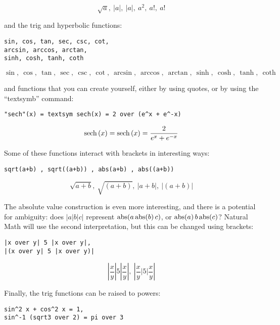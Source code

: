 \documentclass[12pt]{article}
\begin{document}
\[
\sqrt{a} , \ \left| a \right| , \ \left| a \right| , \ {a} ^ 2 , \ a ! , \ a !
\]

\noindent and the trig and hyperbolic functions:

\begin{verbatim}
sin, cos, tan, sec, csc, cot, 
arcsin, arccos, arctan, 
sinh, cosh, tanh, coth
\end{verbatim}

\[
\sin , \ \cos , \ \tan , \ \sec , \ \csc , \ \cot , \ \arcsin , \ \arccos , \ \arctan , \ \sinh , \ \cosh , \ \tanh , \ \coth
\]

\noindent and functions that you can create yourself, either by using quotes, or by
using the ``textsymb'' command:

\begin{verbatim}
"sech"(x) = textsym sech(x) = 2 over (e^x + e^-x)
\end{verbatim}

\[
\hbox{sech} \left( x \right) = \hbox{sech} \left( x \right) = \frac {2} {{e} ^ {x} + {e} ^ { - x}}
\]

\noindent Some of
these functions interact with brackets in interesting ways:

\begin{verbatim}
sqrt(a+b) , sqrt((a+b)) , abs(a+b) , abs((a+b))
\end{verbatim}

\[
\sqrt{a + b} , \ \sqrt{\left( a + b \right)} , \ \left| a + b \right| , \ \left| \left( a + b \right) \right|
\]

\noindent \def\abs{\hbox{abs}}
The absolute value construction is even more interesting, and
there is a potential for ambiguity: does $|a|b|c|$ represent
$\abs(a\,\abs(b)\,c)$, or $\abs(a)\,b\,\abs(c)$?
Natural Math will use the second interpretation, but this can be
changed using brackets:

\begin{verbatim}
|x over y| 5 |x over y|,
|(x over y| 5 |x over y)|
\end{verbatim}

\[
\left| \frac {x} {y} \right| 5 \left| \frac {x} {y} \right| , \ \left| \frac {x} {y} \left| 5 \right| \frac {x} {y} \right|
\]

\noindent Finally, the trig functions can be raised to powers:

\begin{verbatim}
sin^2 x + cos^2 x = 1,
sin^-1 (sqrt3 over 2) = pi over 3
\end{verbatim}
\end{document}
